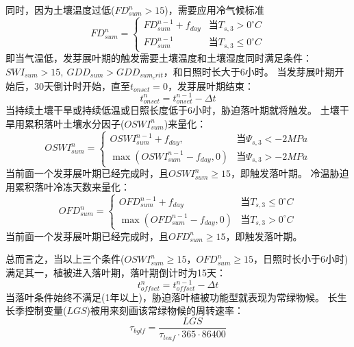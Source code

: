 同时，因为土壤温度过低($FD_{sum}^n>15$)，需要应用冷气候标准
\begin{equation}
F D_{sum}^{n}=\left\{\begin{array}{ll}F D_{sum}^{n-1}+f_{d a y} &  { 当 } T_{s, 3}>0^{\circ}{C} \\ F D_{sum}^{n-1} &  { 当 } T_{s, 3} \leq 0^{\circ}{C}\end{array}\right.
\end{equation}
即当气温低，发芽展叶期的触发需要土壤温度和土壤湿度同时满足条件：
$SWI_{sum}>15,\ GDD_{sum}>GDD_{sum_crit}$，和日照时长大于6小时。
当发芽展叶期开始后，30天倒计时开始，直至$t_{onset}=0$，发芽展叶期结束：
\begin{equation}
t_{o n s e t}^{n}=t_{o n s e t}^{n-1}-\Delta t
\end{equation}
当持续土壤干旱或持续低温或日照长度低于6小时，胁迫落叶期就将触发。
土壤干旱用累积落叶土壤水分因子($OSWI_{sum}^n$)来量化：
\begin{equation}
OSWI_{sum}^{n}=\left\{\begin{array}{ll}OSWI_{sum}^{n-1}+f_{d a y}, &  { 当 } \Psi_{s, 3}<-2 M P a \\ \max \left(OSWI_{sum}^{n-1}-f_{d a y}, 0\right) &  { 当 } \Psi_{s, 3}>-2 M P a\end{array}\right.
\end{equation}
当前面一个发芽展叶期已经完成时，且$OSWI_{sum}^n\geq15$，即触发落叶期。
冷温胁迫用累积落叶冷冻天数来量化：
\begin{equation}
OFD_{sum}^{n}=\left\{\begin{array}{ll}OFD_{sum}^{n-1}+f_{d a y} &  { 当 }{T}_{s, 3} \leq 0^{\circ}{C} \\ \max \left(OFD_{sum}^{n-1}-f_{d a y}, 0\right) &  { 当 }{T}_{s, 3}>0^{\circ}{C}\end{array}\right.
\end{equation}
当前面一个发芽展叶期已经完成时，且$OFD_{sum}^n\geq15$，即触发落叶期。


总而言之，当以上三个条件($OSWI_{sum}^n\geq15$，$OFD_{sum}^n\geq15$，日照时长小于6小时)满足其一，植被进入落叶期，落叶期倒计时为15天：
\begin{equation}
t_{offset}^{n}=t_{offset}^{n-1}-\Delta t
\end{equation}
当落叶条件始终不满足(1年以上)，胁迫落叶植被功能型就表现为常绿物候。
长生长季控制变量($LGS$)被用来刻画该常绿物候的周转速率：
\begin{equation}
\tau_{b g l f}=\frac{L G S}{\tau_{leaf} \cdot 365 \cdot 86400}
\end{equation}

